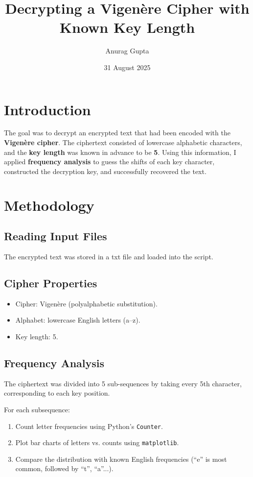 \documentclass[12pt]{article}
\title{Decrypting a Vigen\`ere Cipher with Known Key Length}
\author{Anurag Gupta}
\date{31 August 2025}
\begin{document}
\maketitle

\section{Introduction}
The goal was to decrypt an encrypted text that had been 
encoded with the \textbf{Vigen\`ere cipher}. 
The ciphertext consisted of lowercase alphabetic characters, 
and the \textbf{key length }was known in advance to be \textbf{5}. 
Using this information, I applied \textbf{frequency analysis} 
to guess the shifts of each key character, 
constructed the decryption key, and successfully recovered 
the text.

\section{Methodology}

\subsection{Reading Input Files}
The encrypted text was stored in a txt file and loaded into the script.

\subsection{Cipher Properties}
\begin{itemize}
    \item Cipher: Vigen\`ere (polyalphabetic substitution).
    \item Alphabet: lowercase English letters (a--z).
    \item Key length: 5.
\end{itemize}

\subsection{Frequency Analysis}
The ciphertext was divided into 5 sub-sequences by taking every 5th character, corresponding to each key position.

For each subsequence:
\begin{enumerate}
    \item Count letter frequencies using Python's \texttt{Counter}.
    \item Plot bar charts of letters vs. counts using \texttt{matplotlib}.
    \item Compare the distribution with known English frequencies (``e'' is most common, followed by ``t'', ``a''...).
\end{enumerate}
\end{document}
